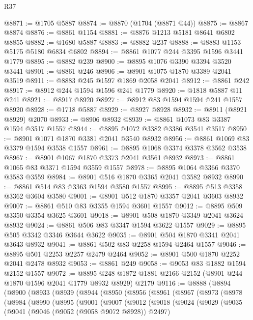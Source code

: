\begin{lexlean}{R37}
\begin{coremodule}
@8871 := @1705 @5887
@8874 := @8870 (@1704 (@8871 @44))
@8875 := @8867 @8874
@8876 := @8861 @1154
@8881 := @8876 @1213 @5181 @8641 @6802 @8855
@8882 := @1680 @5887
@8883 := @8882 @237
@8888 := @8883 @1153 @5175 @5180 @6834 @6802
@8894 := @8861 @1077 @244 @3395 @1596 @3441 @1779
@8895 := @8882 @239
@8900 := @8895 @1076 @3390 @3394 @3520 @3441
@8901 := @8861 @246
@8906 := @8901 @1075 @1870 @3389 @2041 @3519
@8911 := @8883 @245 @1597 @1869 @2058 @2041
@8912 := @8861 @242
@8917 := @8912 @244 @1594 @1596 @241 @1779
@8920 := @1818 @5887 @11 @241
@8921 := @8917 @8920
@8927 := @8912 @83 @1594 @1594 @241 @1557 @8920
@8928 := @1718 @5887
@8929 := @8927 @8928
@8932 := @8911 (@8921 @8929) @2070
@8933 := @8906 @8932
@8939 := @8861 @1073 @83 @3387 @1594 @3517 @1557
@8944 := @8895 @1072 @3382 @3386 @3541 @3517
@8950 := @8901 @1071 @1870 @3381 @2041 @3540 @8932
@8956 := @8861 @1069 @83 @3379 @1594 @3538 @1557
@8961 := @8895 @1068 @3374 @3378 @3562 @3538
@8967 := @8901 @1067 @1870 @3373 @2041 @3561 @8932
@8973 := @8861 @1065 @83 @3371 @1594 @3559 @1557
@8978 := @8895 @1064 @3366 @3370 @3583 @3559
@8984 := @8901 @516 @1870 @3365 @2041 @3582 @8932
@8990 := @8861 @514 @83 @3363 @1594 @3580 @1557
@8995 := @8895 @513 @3358 @3362 @3604 @3580
@9001 := @8901 @512 @1870 @3357 @2041 @3603 @8932
@9007 := @8861 @510 @83 @3355 @1594 @3601 @1557
@9012 := @8895 @509 @3350 @3354 @3625 @3601
@9018 := @8901 @508 @1870 @3349 @2041 @3624 @8932
@9024 := @8861 @506 @83 @3347 @1594 @3622 @1557
@9029 := @8895 @505 @3342 @3346 @3644 @3622
@9035 := @8901 @504 @1870 @3341 @2041 @3643 @8932
@9041 := @8861 @502 @83 @2258 @1594 @2464 @1557
@9046 := @8895 @501 @2253 @2257 @2479 @2464
@9052 := @8901 @500 @1870 @2252 @2041 @2478 @8932
@9053 := @8861 @249
@9058 := @9053 @83 @1882 @1594 @2152 @1557
@9072 := @8895 @248 @1872 @1881 @2166 @2152 (@8901 @244 @1870 @1596 @2041 @1779 @8932 @8929) @2179
@9116 := @8888
    (@8894
      (@8900
        (@8933
          (@8939
            (@8944
              (@8950
                (@8956
                  (@8961
                    (@8967
                      (@8973
                        (@8978
                          (@8984
                            (@8990
                              (@8995
                                (@9001
                                  (@9007
                                    (@9012
                                      (@9018
                                        (@9024
                                          (@9029
                                            (@9035
                                              (@9041
                                                (@9046 (@9052 (@9058 @9072 @8928)) @2497)

\end{coremodule}
\end{lexlean}
